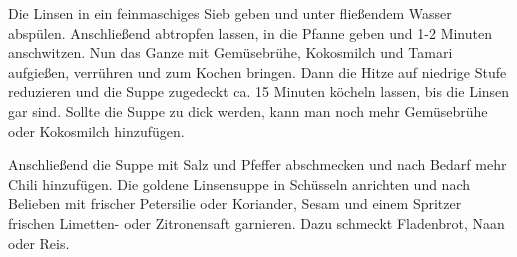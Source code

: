 \begin{recipeDP}
{        \step Die Linsen in ein feinmaschiges Sieb geben und unter fließendem Wasser abspülen.
        Anschließend abtropfen lassen, in die Pfanne geben und 1-2 Minuten anschwitzen.
        Nun das Ganze mit Gemüsebrühe, Kokosmilch und Tamari aufgießen, verrühren und zum Kochen bringen.
        Dann die Hitze auf niedrige Stufe reduzieren und die Suppe zugedeckt ca. 15 Minuten köcheln lassen, bis die Linsen gar sind.
        Sollte die Suppe zu dick werden, kann man noch mehr Gemüsebrühe oder Kokosmilch hinzufügen.

        \step Anschließend die Suppe mit Salz und Pfeffer abschmecken und nach Bedarf mehr Chili hinzufügen.
        Die goldene Linsensuppe in Schüsseln anrichten und nach Belieben mit frischer Petersilie oder Koriander, Sesam und einem Spritzer frischen Limetten- oder Zitronensaft garnieren. Dazu schmeckt Fladenbrot, Naan oder Reis.
    }



\end{recipeDP}